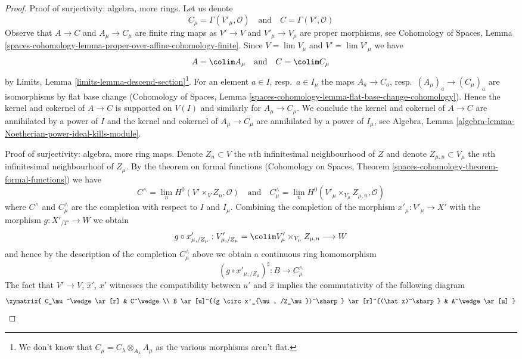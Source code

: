 \begin{proof}
\medskip\noindent
Proof of surjectivity: algebra, more rings.
Let us denote
$$
C_\mu = \Gamma(V'_\mu, \mathcal{O})
\quad\text{and}\quad
C = \Gamma(V', \mathcal{O})
$$
Observe that $A \to C$ and $A_\mu \to C_\mu$ are finite ring maps as
$V' \to V$ and $V'_\mu \to V_\mu$ are proper morphisms, see
Cohomology of Spaces, Lemma
\ref{spaces-cohomology-lemma-proper-over-affine-cohomology-finite}.
Since $V = \lim V_\mu$ and $V' = \lim V'_\mu$
we have
$$
A = \colim A_\mu
\quad\text{and}\quad
C = \colim C_\mu
$$
by Limits, Lemma \ref{limits-lemma-descend-section}\footnote{We don't
know that $C_\mu = C_\lambda \otimes_{A_\lambda} A_\mu$ as the
various morphisms aren't flat.}. For an element
$a \in I$, resp.\ $a \in I_\mu$ the maps $A_a \to C_a$,
resp.\ $(A_\mu)_a \to (C_\mu)_a$ are isomorphisms by flat base change
(Cohomology of Spaces, Lemma
\ref{spaces-cohomology-lemma-flat-base-change-cohomology}).
Hence the kernel and cokernel of $A \to C$ is supported
on $V(I)$ and similarly for $A_\mu \to C_\mu$.
We conclude the kernel and cokernel of $A \to C$
are annihilated by a power of $I$ and the kernel and cokernel of
$A_\mu \to C_\mu$ are annihilated by a power of $I_\mu$, see
Algebra, Lemma \ref{algebra-lemma-Noetherian-power-ideal-kills-module}.

\medskip\noindent
Proof of surjectivity: algebra, more ring maps.
Denote $Z_n \subset V$ the $n$th infinitesimal
neighbourhood of $Z$ and denote $Z_{\mu, n} \subset V_\mu$
the $n$th infinitesimal neighbourhoof of $Z_\mu$.
By the theorem on formal functions
(Cohomology on Spaces, Theorem
\ref{spaces-cohomology-theorem-formal-functions})
we have
$$
C^\wedge = \lim_n H^0(V' \times_V Z_n, \mathcal{O})
\quad\text{and}\quad
C_\mu^\wedge =
\lim_n H^0(V'_\mu \times_{V_\mu} Z_{\mu, n}, \mathcal{O})
$$
where $C^\wedge$ and $C_\mu^\wedge$ are the completion with
respect to $I$ and $I_\mu$.
Combining the completion of the morphism
$x'_\mu : V'_\mu \to X'$ with the morphism $g : X'_{/T'} \to W$ we obtain
$$
g \circ x'_{\mu, /Z_\mu} :
V'_{\mu, /Z_\mu} = \colim V_\mu' \times_{V_\mu} Z_{\mu, n}
\longrightarrow
W
$$
and hence by the description of the completion
$C_\mu^\wedge$ above we obtain a continuous ring homomorphism
$$
(g \circ x'_{\mu, /Z_\mu})^\sharp : B \longrightarrow C_\mu^\wedge
$$
The fact that $V' \to V$, $\hat x'$, $x'$ witnesses the compatibility
between $u'$ and $\hat x$ implies the
commutativity of the following diagram
$$
\xymatrix{
C_\mu^\wedge \ar[r] &
C^\wedge \\
B \ar[u]^{(g \circ x'_{\mu, /Z_\mu})^\sharp} \ar[r]^{(\hat x)^\sharp} &
A^\wedge \ar[u]
}
$$


\end{proof}
